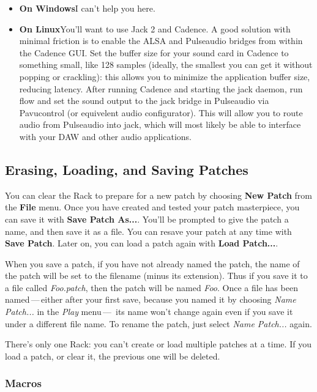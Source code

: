 \documentclass{article}
\begin{document}
\begin{itemize}
\item {\bf On Windows}\quad I can't help you here.

\item {\bf On Linux}\quad You'll want to use Jack 2 and Cadence. A good solution with minimal friction is to enable the ALSA and Pulseaudio bridges from within the Cadence GUI. Set the buffer size for your sound card in Cadence to something small, like 128 samples (ideally, the smallest you can get it without popping or crackling): this allows you to minimize the application buffer size, reducing latency. After running Cadence and starting the jack daemon, run flow and set the sound output to the jack bridge in Pulseaudio via Pavucontrol (or equivelent audio configurator). This will allow you to route audio from Pulseaudio into jack, which will most likely be able to interface with your DAW and other audio applications.

\end{itemize}

\subsection{Erasing, Loading, and Saving Patches}

You can clear the Rack to prepare for a new patch by choosing {\bf New Patch} from the {\bf File} menu.  Once you have created and tested your patch masterpiece, you can save it with {\bf Save Patch As...}.  You'll be prompted to give the patch a name, and then save it as a file.   You can resave your patch at any time with {\bf Save Patch}.  Later on, you can load a patch again with {\bf Load Patch...}.

When you save a patch, if you have not already named the patch, the name of the patch will be set to the filename (minus its extension).  Thus if you save it to a file called {\it Foo.patch}, then the patch will be named {\it Foo}.  Once a file has been named\,---\,either after your first save, because you named it by choosing {\it Name Patch...} in the {\it Play} menu\,---\, its name won't change again even if you save it under a different file name.  To rename the patch, just select {\it Name Patch...} again.

There's only one Rack: you can't create or load multiple patches at a time.  If you load a patch, or clear it, the previous one will be deleted.

\subsubsection{Macros}
\label{aboutmacros}
\end{document}
